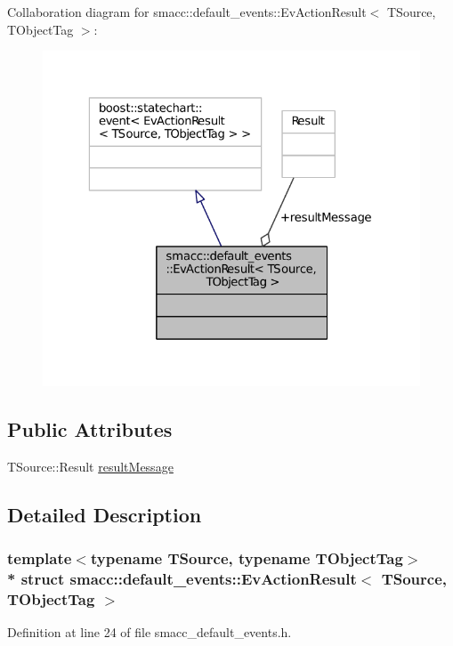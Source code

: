 Collaboration diagram for smacc\+:\+:default\+\_\+events\+:\+:Ev\+Action\+Result$<$ T\+Source, T\+Object\+Tag $>$\+:
\nopagebreak
\begin{figure}[H]
\begin{center}
\leavevmode
\includegraphics[width=323pt]{structsmacc_1_1default__events_1_1EvActionResult__coll__graph}
\end{center}
\end{figure}
\subsection*{Public Attributes}
\begin{DoxyCompactItemize}
\item 
T\+Source\+::\+Result \hyperlink{structsmacc_1_1default__events_1_1EvActionResult_a446603e4d43ded6c16a7abba1bf8bfcd}{result\+Message}
\end{DoxyCompactItemize}


\subsection{Detailed Description}
\subsubsection*{template$<$typename T\+Source, typename T\+Object\+Tag$>$\\*
struct smacc\+::default\+\_\+events\+::\+Ev\+Action\+Result$<$ T\+Source, T\+Object\+Tag $>$}



Definition at line 24 of file smacc\+\_\+default\+\_\+events.\+h.



